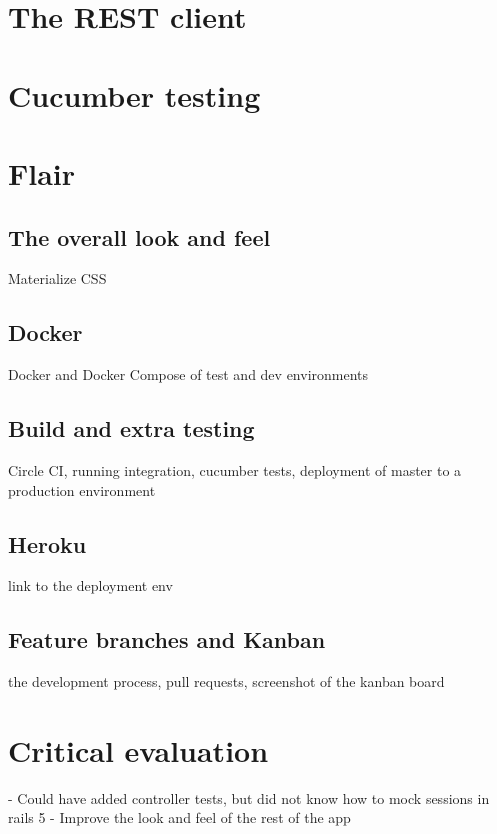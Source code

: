 \documentclass[a4paper, 11pt, titlepage]{article}
\begin{document}
\section{The REST client}

\section{Cucumber testing}

\section{Flair}
\subsection{The overall look and feel}
Materialize CSS

\subsection{Docker}
Docker and Docker Compose of test and dev environments

\subsection{Build and extra testing}
Circle CI, running integration, cucumber tests, deployment of master to a production environment

\subsection{Heroku}
link to the deployment env

\subsection{Feature branches and Kanban}
the development process, pull requests, screenshot of the kanban board

\section{Critical evaluation}
- Could have added controller tests, but did not know how to mock sessions in rails 5
- Improve the look and feel of the rest of the app

%
%
\end{document}
